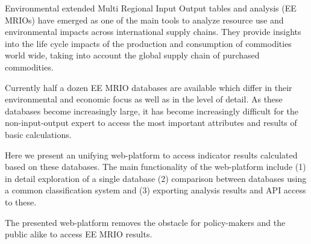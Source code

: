 Environmental extended Multi Regional Input Output tables and analysis (EE MRIOs) have emerged as one of the main tools to analyze resource use and environmental impacts across international supply chains. They provide insights into the life cycle impacts of the production and consumption of commodities world wide, taking into account the global supply chain of purchased commodities.

Currently half a dozen EE MRIO databases are available which differ in their environmental and economic focus as well as in the level of detail. As these databases become increasingly large, it has become increasingly difficult for the non-input-output expert to access the most important attributes and results of basic calculations.

Here we present an unifying web-platform to access indicator results calculated based on these databases. The main functionality of the web-platform include (1) in detail exploration of a single database (2) comparison between databases using a common classification system and (3) exporting analysis results and API access to these.

The presented web-platform removes the obstacle for policy-makers and the public alike to access EE MRIO results. 
